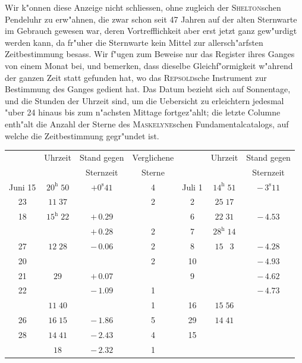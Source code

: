 \documentclass[12pt,a4paper]{article}
\begin{document}
Wir k"onnen diese Anzeige nicht schliessen, ohne zugleich der \textsc{Shelton}schen Pendeluhr zu erw"ahnen,
die zwar schon seit 47 Jahren auf der alten Sternwarte im Gebrauch gewesen war, deren Vortrefflichkeit
aber erst jetzt ganz gew"urdigt werden kann, da fr"uher die Sternwarte kein Mittel zur allersch"arfsten
Zeitbestimmung besass. Wir f"ugen zum Beweise nur das Register ihres Ganges von einem Monat bei,
und bemerken, dass dieselbe Gleichf"ormigkeit w"ahrend der ganzen Zeit statt gefunden hat, wo das
\textsc{Repsold}sche Instrument zur Bestimmung des Ganges gedient hat. Das Datum bezieht sich auf Sonnentage,
und die Stunden der Uhrzeit sind, um die Uebersicht zu erleichtern jedesmal "uber 24 hinaus bis zum
n"achsten Mittage fortgez"ahlt; die letzte Columne enth"alt die Anzahl der Sterne des \textsc{Maskelyne}schen
Fundamentalcatalogs, auf welche die Zeitbestimmung gegr"undet ist.

\newpage

\begin{center}
\small
\begin{tabular}{c|c|c|c|c|c|c}
\toprule
& Uhrzeit & Stand gegen & Verglichene & & Uhrzeit & Stand gegen \\
& & Sternzeit & Sterne & & & Sternzeit \\
\midrule
Juni 15 & $20^{\mathrm{h}}\;50$ & $+0^{\mathrm{s}}41$ & 4 & Juli \phantom{0}1 & $14^{\mathrm{h}}\;51$ & $-\,3^{\mathrm{s}}11$ \\
\phantom{15} 23 & $11\;37$ & & 2 & \phantom{0}\phantom{0}\phantom{0} 2 & $25\;17$ & \\
\phantom{15} 18 & $15^{\mathrm{h}}\;22$ & $+\,0.29$ & & \phantom{0}\phantom{0}\phantom{0} 6 & $22\;31$ & $-\,4.53$ \\
& & $+\,0.28$ & 2 & \phantom{0}\phantom{0}\phantom{0} 7 & $28^{\mathrm{h}}\;14$ & \\
\phantom{15} 27 & $12\;28$ & $-\,0.06$ & 2 & \phantom{0}\phantom{0}\phantom{0} 8 & $15\;\phantom{0}3$ & $-\,4.28$ \\
\phantom{15} 20 & & & 2 & \phantom{0}\phantom{0} 10 & & $-\,4.93$ \\
\phantom{15} 21 & $29$ & $+\,0.07$ & & \phantom{0}\phantom{0}\phantom{0} 9 & & $-\,4.62$ \\
\phantom{15} 22 & & $-\,1.09$ & 1 & & & $-\,4.73$ \\
\phantom{15} & $11\;40$ & & 1 & \phantom{0}\phantom{0} 16 & $15\;56$ & \\
\phantom{15} 26 & $16\;15$ & $-\,1.86$ & 5 & \phantom{0}\phantom{0} 29 & $14\;41$ & \\
\phantom{15} 28 & $14\;41$ & $-\,2.43$ & 4 & \phantom{0}\phantom{0} 15 & & \\
& $18$ & $-\,2.32$ & 1 & & & \\
\bottomrule
\end{tabular}
\end{center}
\end{document}
